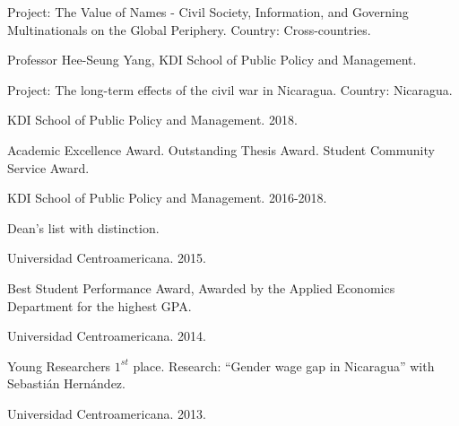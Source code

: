 \documentclass[11pt,article,oneside, a4paper]{memoir}
\begin{document}
\ind \hspace{0.35in} \footnotesize Project: The Value of Names - Civil Society, Information, and Governing Multinationals on the
Global Periphery. \newline Country: Cross-countries. \normalsize \vspace{0.01in}

\ind Professor Hee-Seung Yang, KDI School of Public Policy and Management.

\ind \hspace{0.35in} \footnotesize Project: The long-term effects of the civil war in Nicaragua. \newline Country: Nicaragua. \normalsize \vspace{0.01in}

\bigskip

\ind KDI School of Public Policy and Management. 2018.

\ind \hspace{0.35in} \footnotesize Academic Excellence Award. Outstanding Thesis Award. Student Community Service Award. \normalsize \vspace{0.01in}

\ind KDI School of Public Policy and Management. 2016-2018. 

\ind \hspace{0.35in} \footnotesize Dean's list with distinction. \normalsize \vspace{0.01in}

\ind Universidad Centroamericana. 2015.

\ind \hspace{0.35in} \footnotesize Best Student Performance Award, Awarded by the Applied Economics Department for the highest GPA. \normalsize \vspace{0.01in}

\ind Universidad Centroamericana. 2014. 

\ind \hspace{0.35in} \footnotesize Young Researchers $1^{st}$ place. Research: ``Gender wage gap in Nicaragua'' with Sebastián Hernández. \normalsize \vspace{0.01in}

\ind Universidad Centroamericana. 2013. 
\end{document}
